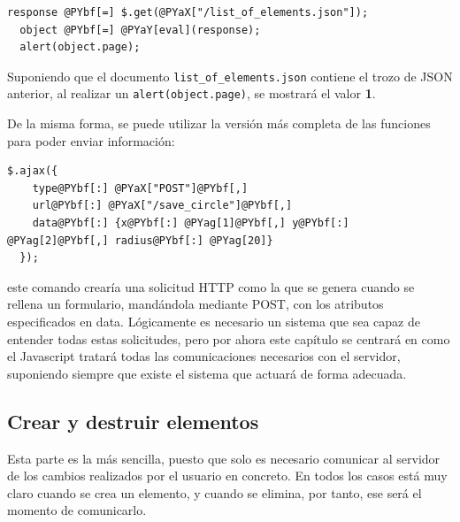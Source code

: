 \begin{Verbatim}[commandchars=@\[\]]
  response @PYbf[=] $.get(@PYaX["/list_of_elements.json"]);
  object @PYbf[=] @PYaY[eval](response);
  alert(object.page);
\end{Verbatim}


Suponiendo que el documento \texttt{list\_of\_elements.json} contiene el trozo de JSON anterior, al realizar un \texttt{alert(object.page)}, se mostrará el valor \textbf{1}.

De la misma forma, se puede utilizar la versión más completa de las funciones para poder enviar información:

\begin{Verbatim}[commandchars=@\[\]]
  $.ajax({
    type@PYbf[:] @PYaX["POST"]@PYbf[,]
    url@PYbf[:] @PYaX["/save_circle"]@PYbf[,]
    data@PYbf[:] {x@PYbf[:] @PYag[1]@PYbf[,] y@PYbf[:] @PYag[2]@PYbf[,] radius@PYbf[:] @PYag[20]}
  });
\end{Verbatim}


este comando crearía una solicitud HTTP como la que se genera cuando se rellena un formulario, mandándola mediante POST, con los atributos especificados en data. Lógicamente es necesario un sistema que sea capaz de entender todas estas solicitudes, pero por ahora este capítulo se centrará en como el Javascript tratará todas las comunicaciones necesarios con el servidor, suponiendo siempre que existe el sistema que actuará de forma adecuada.

\newpage
\subsection{Crear y destruir elementos} %
\label{ssub:crear_y_destruir_elementos}

Esta parte es la más sencilla, puesto que solo es necesario comunicar al servidor de los cambios realizados por el usuario en concreto. En todos los casos está muy claro cuando se crea un elemento, y cuando se elimina, por tanto, ese será el momento de comunicarlo. 

